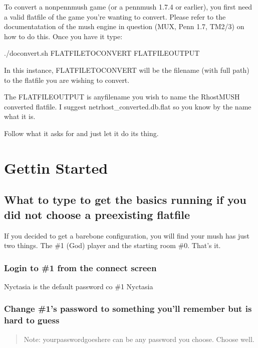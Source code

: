 \documentclass[letterpaper,10pt,english]{sphinxmanual}
\begin{document}
\sphinxAtStartPar
To convert a non\sphinxhyphen{}pennmush game (or a pennmush 1.7.4 or earlier), you first
need a valid flatfile of the game you’re wanting to convert.  Please refer
to the documentatation of the mush engine in question (MUX, Penn 1.7, TM2/3)
on how to do this.  Once you have it type:

\sphinxAtStartPar
./doconvert.sh FLATFILETOCONVERT FLATFILEOUTPUT

\sphinxAtStartPar
In this instance, FLATFILETOCONVERT will be the filename (with full path) to
the flatfile you are wishing to convert.

\sphinxAtStartPar
The FLATFILEOUTPUT is anyfilename you wish to name the RhostMUSH converted
flatfile.  I suggest netrhost\_converted.db.flat so you know by the name
what it is.

\sphinxAtStartPar
Follow what it asks for and just let it do its thing.


\section{Gettin Started}
\label{\detokenize{gettingstarted:gettin-started}}\label{\detokenize{gettingstarted::doc}}

\subsection{What to type to get the basics running if you did not choose a pre\sphinxhyphen{}existing flatfile}
\label{\detokenize{gettingstarted:what-to-type-to-get-the-basics-running-if-you-did-not-choose-a-pre-existing-flatfile}}
\sphinxAtStartPar
If you decided to get a bare\sphinxhyphen{}bone configuration, you will find your mush
has just two things.  The \#1 (God) player and the starting room \#0.  That’s it.


\subsubsection{Login to \#1 from the connect screen}
\label{\detokenize{gettingstarted:login-to-1-from-the-connect-screen}}
\sphinxAtStartPar
Nyctasia is the default password
co \#1 Nyctasia


\subsubsection{Change \#1’s password to something you’ll remember but is hard to guess}
\label{\detokenize{gettingstarted:change-1-s-password-to-something-you-ll-remember-but-is-hard-to-guess}}\begin{quote}

\sphinxAtStartPar
Note: yourpasswordgoeshere can be any password you choose.  Choose well.
\end{quote}
\end{document}
